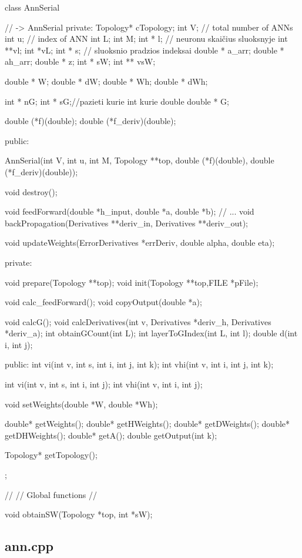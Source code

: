 class AnnSerial{ // -> AnnSerial
private:
  Topology* cTopology;
  int V; // total number of ANNs
  int u; // index of ANN
  int L;
  int M;
  int * l; // neuronu skaičius sluoksnyje
  int **vl;
  int *vL;
  int * s; // sluoksnio pradzios indeksai
  double * a\_arr;
  double * ah\_arr;
  double * z;
  int * sW;
  int ** vsW;

  double * W;
  double * dW;
  double * Wh;
  double * dWh;


  int * nG;
  int * sG;//pazieti kurie int kurie double
  double * G;

  double (*f)(double);
  double (*f\_deriv)(double);


public:

  AnnSerial(int V, int u, int M, Topology **top,  double (*f)(double), double (*f\_deriv)(double));

  void destroy();

  void feedForward(double *h\_input, double *a, double *b); // ...
  void backPropagation(Derivatives **deriv\_in, Derivatives **deriv\_out);

  void updateWeights(ErrorDerivatives *errDeriv, double alpha, double eta);

private:

  void prepare(Topology **top);
  void init(Topology **top,FILE *pFile);

  void calc\_feedForward();
  void copyOutput(double *a);

  void calcG();
  void calcDerivatives(int v, Derivatives *deriv\_h, Derivatives *deriv\_a);
  int obtainGCount(int L);
  int layerToGIndex(int L, int l);
  double d(int i, int j);

public:
  int vi(int v, int s, int i, int j, int k);
  int vhi(int v, int i, int j, int k);

  int vi(int v, int s, int i, int j);
  int vhi(int v, int i, int j);


  void setWeights(double *W, double *Wh);

  double* getWeights();
  double* getHWeights();
  double* getDWeights();
  double* getDHWeights();
  double* getA();
  double getOutput(int k);

  Topology* getTopology();
};

//
// Global functions
//

void obtainSW(Topology *top, int *sW);


\subsection{ann.cpp}


